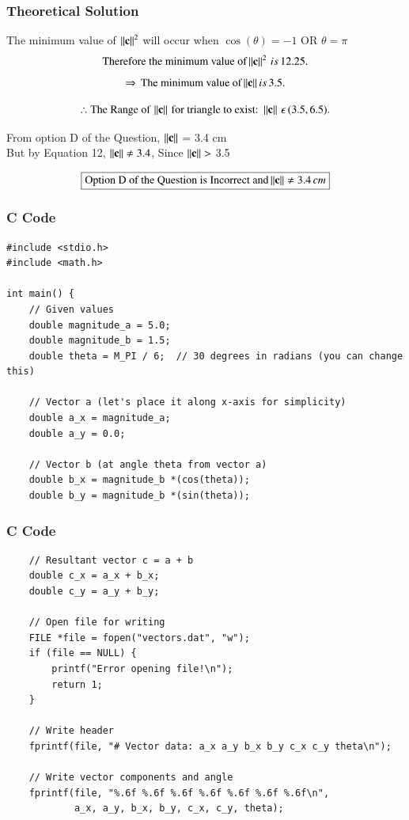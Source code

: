 \documentclass{beamer}
\begin{document}
\begin{frame}[fragile]
    \frametitle{Theoretical Solution}
    
The minimum value of $\left\lVert\mathbf{c}\right\rVert^2$ will occur when $\cos{(\theta)}=-1$ OR $\theta = \pi$
\begin{equation}
    \text{Therefore the minimum value of} \left\lVert\mathbf{c}\right\rVert^2 \, is \, 12.25. \\
    \end{equation}
    \begin{equation}
    \Rightarrow \, \text{The minimum value of} \left\lVert\mathbf{c}\right\rVert is \, 3.5.
\end{equation}

\begin{equation}
    \therefore \text{The Range of} \, \left\lVert\mathbf{c}\right\rVert \, \text{for triangle to exist: } \left\lVert\mathbf{c}\right\rVert \, \epsilon \, (3.5, 6.5).
\end{equation}

From option D of the Question, $\left\lVert\mathbf{c}\right\rVert$ = 3.4 cm\\
But by Equation 12, $\left\lVert\mathbf{c}\right\rVert \neq 3.4$, Since $\left\lVert\mathbf{c}\right\rVert > $  3.5

\begin{align}
    \boxed{\text{Option D of the Question is Incorrect and} \left\lVert\mathbf{c}\right\rVert \neq 3.4 \, cm}
\end{align}
\end{frame}



\begin{frame}[fragile]
    \frametitle{C Code}
    \begin{lstlisting}
#include <stdio.h>
#include <math.h>

int main() {
    // Given values
    double magnitude_a = 5.0;
    double magnitude_b = 1.5;
    double theta = M_PI / 6;  // 30 degrees in radians (you can change this)

    // Vector a (let's place it along x-axis for simplicity)
    double a_x = magnitude_a;
    double a_y = 0.0;

    // Vector b (at angle theta from vector a)
    double b_x = magnitude_b *(cos(theta));
    double b_y = magnitude_b *(sin(theta));
    \end{lstlisting}
\end{frame}

\begin{frame}[fragile]
    \frametitle{C Code}
    \begin{lstlisting}
    // Resultant vector c = a + b
    double c_x = a_x + b_x;
    double c_y = a_y + b_y;

    // Open file for writing
    FILE *file = fopen("vectors.dat", "w");
    if (file == NULL) {
        printf("Error opening file!\n");
        return 1;
    }

    // Write header
    fprintf(file, "# Vector data: a_x a_y b_x b_y c_x c_y theta\n");

    // Write vector components and angle
    fprintf(file, "%.6f %.6f %.6f %.6f %.6f %.6f %.6f\n", 
            a_x, a_y, b_x, b_y, c_x, c_y, theta);

    \end{lstlisting}
\end{frame}
\end{document}
